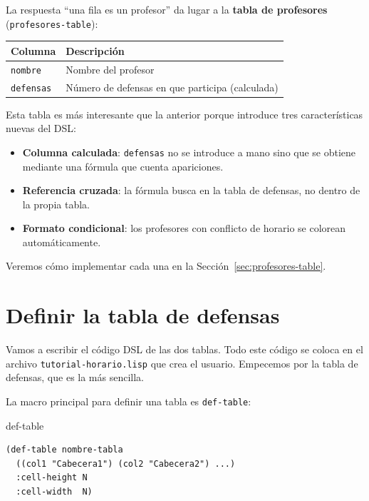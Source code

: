 \documentclass[12pt,a4paper]{report}
\begin{document}
La respuesta ``una fila es un profesor'' da lugar a la \textbf{tabla de
profesores} (\texttt{profesores-table}):

\begin{center}
\begin{tabular}{ll}
\toprule
\textbf{Columna}   & \textbf{Descripción} \\
\midrule
\texttt{nombre}    & Nombre del profesor \\
\texttt{defensas}  & Número de defensas en que participa (calculada) \\
\bottomrule
\end{tabular}
\end{center}

Esta tabla es más interesante que la anterior porque introduce tres
características nuevas del DSL:
\begin{itemize}
  \item \textbf{Columna calculada}: \texttt{defensas} no se introduce a mano
    sino que se obtiene mediante una fórmula que cuenta apariciones.
  \item \textbf{Referencia cruzada}: la fórmula busca en la tabla de defensas,
    no dentro de la propia tabla.
  \item \textbf{Formato condicional}: los profesores con conflicto de horario
    se colorean automáticamente.
\end{itemize}
Veremos cómo implementar cada una en la
Sección~\ref{sec:profesores-table}.

\section{Definir la tabla de defensas}
\label{sec:defensas-table}

Vamos a escribir el código DSL de las dos tablas.  Todo este código se coloca
en el archivo \texttt{tutorial-horario.lisp} que crea el usuario.
Empecemos por la tabla de defensas, que es la más sencilla.

La macro principal para definir una tabla es \texttt{def-table}:

\begin{sintaxisbox}{def-table}
\begin{lstlisting}
(def-table nombre-tabla
  ((col1 "Cabecera1") (col2 "Cabecera2") ...)
  :cell-height N
  :cell-width  N)
\end{lstlisting}
\end{sintaxisbox}
\end{document}
